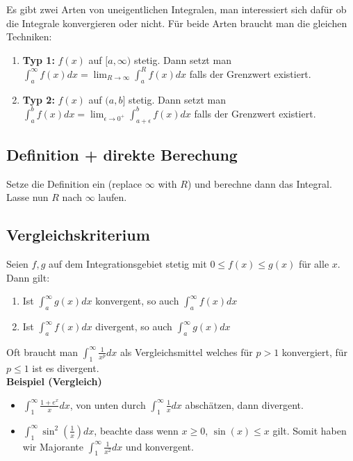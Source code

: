 \documentclass[25pt]{sciposter}
\begin{document}
\begin{multicols}{3}
Es gibt zwei Arten von uneigentlichen Integralen, man interessiert sich dafür ob die Integrale konvergieren oder nicht. Für beide Arten braucht man die gleichen Techniken:

\begin{enumerate}
	\item[] \textbf{Typ 1:} $f(x)$ auf $[a,\infty)$ stetig. Dann setzt man $\int_{a}^{\infty} f(x) dx = \lim_{R \to \infty} \int_{a}^{R} f(x) dx$ falls der Grenzwert existiert.
	\item[] \textbf{Typ 2:} $f(x)$ auf $(a,b]$ stetig. Dann setzt man $\int_{a}^{b} f(x) dx= \lim_{\epsilon \to 0^+} \int_{a+\epsilon}^{b} f(x) dx$ falls der Grenzwert existiert.
\end{enumerate}


\subsection*{Definition + direkte Berechung}
Setze die Definition ein (replace $\infty$ with $R$) und berechne dann das Integral. Lasse nun $R$ nach $\infty$ laufen.

\subsection*{Vergleichskriterium}
 Seien $f,g$ auf dem Integrationsgebiet stetig mit $0 \leq f(x) \leq g(x)$ für alle $x$. Dann gilt:
 \begin{enumerate}
 	\item Ist $\int_{a}^{\infty} g(x) dx$ konvergent, so auch $\int_{a}^{\infty} f(x) dx$
 	\item Ist $\int_{a}^{\infty} f(x) dx$ divergent, so auch $\int_{a}^{\infty} g(x) dx$
 \end{enumerate}
 Oft braucht man $\int_{1}^{\infty} \frac{1}{x^p} dx$ als Vergleichsmittel welches für $p>1$ konvergiert, für $p \leq 1$ ist es divergent.\\
\textbf{Beispiel (Vergleich)} 
\begin{itemize}
	\item $\int_{1}^{\infty} \frac{1 + e^x}{x} dx$, von unten durch $\int_{1}^{\infty} \frac{1}{x} dx$ abschätzen, dann divergent.
	\item $\int_1 ^\infty \sin^2\left(\frac{1}{x}\right) dx$, beachte dass wenn $x \geq 0$, $\sin(x) \leq x$ gilt. Somit haben wir Majorante $\int_{1}^{\infty} \frac{1}{x^2} dx$ und konvergent. 
\end{itemize}



\end{multicols}
\end{document}
